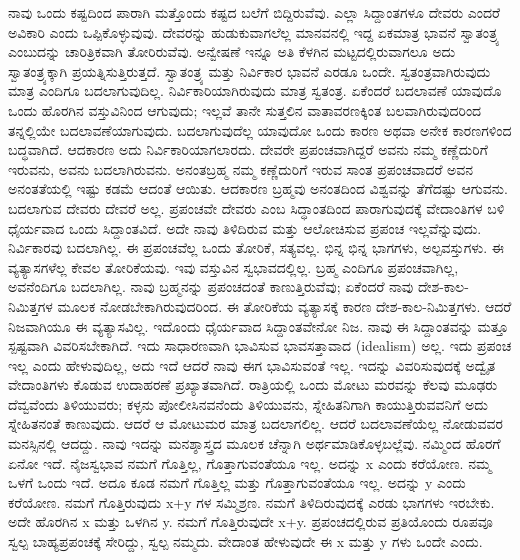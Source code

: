 ನಾವು ಒಂದು ಕಷ್ಟದಿಂದ ಪಾರಾಗಿ ಮತ್ತೊಂದು ಕಷ್ಟದ ಬಲೆಗೆ ಬಿದ್ದಿರುವೆವು. ಎಲ್ಲಾ ಸಿದ್ದಾಂತಗಳೂ ದೇವರು ಎಂದರೆ ಅವಿಕಾರಿ ಎಂದು ಒಪ್ಪಿಕೊಳ್ಳುವುವು. ದೇವರನ್ನು ಹುಡುಕುವಾಗಲೆಲ್ಲ ಮಾನವನಲ್ಲಿ ಇದ್ದ ಏಕಮಾತ್ರ ಭಾವನೆ ಸ್ವಾತಂತ್ರ್ಯ ಎಂಬುದನ್ನು ಚಾರಿತ್ರಿಕವಾಗಿ ತೋರಿರುವೆವು. ಅನ್ವೇಷಣೆ ಇನ್ನೂ ಅತಿ ಕೆಳಗಿನ ಮಟ್ಟದಲ್ಲಿರುವಾಗಲೂ ಅದು ಸ್ವಾತಂತ್ರ್ಯಕ್ಕಾಗಿ ಪ್ರಯತ್ನಿಸುತ್ತಿರುತ್ತದೆ. ಸ್ವಾತಂತ್ರ್ಯ ಮತ್ತು ನಿರ್ವಿಕಾರ ಭಾವನೆ ಎರಡೂ ಒಂದೇ. ಸ್ವತಂತ್ರವಾಗಿರುವುದು ಮಾತ್ರ ಎಂದಿಗೂ ಬದಲಾಗುವುದಿಲ್ಲ. ನಿರ್ವಿಕಾರಿಯಾಗಿರುವುದು ಮಾತ್ರ ಸ್ವತಂತ್ರ. ಏಕೆಂದರೆ ಬದಲಾವಣೆ ಯಾವುದೊ ಒಂದು ಹೊರಗಿನ ವಸ್ತುವಿನಿಂದ ಆಗುವುದು; ಇಲ್ಲವೆ ತಾನೇ ಸುತ್ತಲಿನ ವಾತಾವರಣಕ್ಕಿಂತ ಬಲವಾಗಿರುವುದರಿಂದ ತನ್ನಲ್ಲಿಯೇ ಬದಲಾವಣೆಯಾಗುವುದು. ಬದಲಾಗುವುದೆಲ್ಲ ಯಾವುದೋ ಒಂದು ಕಾರಣ ಅಥವಾ ಅನೇಕ ಕಾರಣಗಳಿಂದ ಬದ್ಧವಾಗಿದೆ. ಆದಕಾರಣ ಅದು ನಿರ್ವಿಕಾರಿಯಾಗಲಾರದು. ದೇವರೇ ಪ್ರಪಂಚವಾಗಿದ್ದರೆ ಅವನು ನಮ್ಮ ಕಣ್ಣೆದುರಿಗೆ ಇರುವನು, ಅವನು ಬದಲಾಗಿರುವನು. ಅನಂತಬ್ರಹ್ಮ ನಮ್ಮ ಕಣ್ಣೆದುರಿಗೆ ಇರುವ ಸಾಂತ ಪ್ರಪಂಚವಾದರೆ ಅವನ ಅನಂತತೆಯಲ್ಲಿ ಇಷ್ಟು ಕಡಮೆ ಆದಂತೆ ಆಯಿತು. ಆದಕಾರಣ ಬ್ರಹ್ಮವು ಅನಂತದಿಂದ ವಿಶ್ವವನ್ನು ತೆಗೆದಷ್ಟು ಆಗುವನು. ಬದಲಾಗುವ ದೇವರು ದೇವರೆ ಅಲ್ಲ. ಪ್ರಪಂಚವೇ ದೇವರು ಎಂಬ ಸಿದ್ಧಾಂತದಿಂದ ಪಾರಾಗುವುದಕ್ಕೆ ವೇದಾಂತಿಗಳ ಬಳಿ ಧೈರ್ಯವಾದ ಒಂದು ಸಿದ್ದಾಂತವಿದೆ. ಅದೇ ನಾವು ತಿಳಿದಿರುವ ಮತ್ತು ಆಲೋಚಿಸುವ ಪ್ರಪಂಚ ಇಲ್ಲವೆನ್ನುವುದು. ನಿರ್ವಿಕಾರವು ಬದಲಾಗಿಲ್ಲ. ಈ ಪ್ರಪಂಚವೆಲ್ಲ ಒಂದು ತೋರಿಕೆ, ಸತ್ಯವಲ್ಲ. ಭಿನ್ನ ಭಿನ್ನ ಭಾಗಗಳು, ಅಲ್ಪವಸ್ತುಗಳು. ಈ ವ್ಯತ್ಯಾಸಗಳೆಲ್ಲ ಕೇವಲ ತೋರಿಕೆಯವು. ಇವು ವಸ್ತುವಿನ ಸ್ವಭಾವದಲ್ಲಿಲ್ಲ. ಬ್ರಹ್ಮ ಎಂದಿಗೂ ಪ್ರಪಂಚವಾಗಿಲ್ಲ, ಅವನೆಂದಿಗೂ ಬದಲಾಗಿಲ್ಲ. ನಾವು ಬ್ರಹ್ಮನನ್ನು ಪ್ರಪಂಚದಂತೆ ಕಾಣುತ್ತಿರುವೆವು; ಏಕೆಂದರೆ ನಾವು ದೇಶ-ಕಾಲ-ನಿಮಿತ್ತಗಳ ಮೂಲಕ ನೋಡಬೇಕಾಗಿರುವುದರಿಂದ. ಈ ತೋರಿಕೆಯ ವ್ಯತ್ಯಾಸಕ್ಕೆ ಕಾರಣ ದೇಶ-ಕಾಲ-ನಿಮಿತ್ತಗಳು. ಆದರೆ ನಿಜವಾಗಿಯೂ ಈ ವ್ಯತ್ಯಾಸವಿಲ್ಲ. ಇದೊಂದು ಧೈರ್ಯವಾದ ಸಿದ್ದಾಂತವೇನೋ ನಿಜ. ನಾವು ಈ ಸಿದ್ದಾಂತವನ್ನು ಮತ್ತೂ ಸ್ಪಷ್ಟವಾಗಿ ವಿವರಿಸಬೇಕಾಗಿದೆ. ಇದು ಸಾಧಾರಣವಾಗಿ ಭಾವಿಸುವ ಭಾವಸತ್ತಾವಾದ (idealism) ಅಲ್ಲ. ಇದು ಪ್ರಪಂಚ ಇಲ್ಲ ಎಂದು ಹೇಳುವುದಿಲ್ಲ, ಅದು ಇದೆ ಆದರೆ ನಾವು ಈಗ ಭಾವಿಸುವಂತೆ ಇಲ್ಲ. ಇದನ್ನು ವಿವರಿಸುವುದಕ್ಕೆ ಅದ್ವೈತ ವೇದಾಂತಿಗಳು ಕೊಡುವ ಉದಾಹರಣೆ ಪ್ರಖ್ಯಾತವಾಗಿದೆ. ರಾತ್ರಿಯಲ್ಲಿ ಒಂದು ಮೋಟು ಮರವನ್ನು ಕೆಲವು ಮೂಢರು ದೆವ್ವವೆಂದು ತಿಳಿಯುವರು; ಕಳ್ಳನು ಪೋಲೀಸಿನವನೆಂದು ತಿಳಿಯುವನು, ಸ್ನೇಹಿತನಿಗಾಗಿ ಕಾಯುತ್ತಿರುವವನಿಗೆ ಅದು ಸ್ನೇಹಿತನಂತೆ ಕಾಣುವುದು. ಆದರೆ ಆ ಮೋಟುಮರ ಮಾತ್ರ ಬದಲಾಗಲಿಲ್ಲ. ಆದರೆ ಬದಲಾವಣೆಯೆಲ್ಲ ನೋಡುವವರ ಮನಸ್ಸಿನಲ್ಲಿ ಆದದ್ದು. ನಾವು ಇದನ್ನು ಮನಶ್ಶಾಸ್ತ್ರದ ಮೂಲಕ ಚೆನ್ನಾಗಿ ಅರ್ಥಮಾಡಿಕೊಳ್ಳಬಲ್ಲೆವು. ನಮ್ಮಿಂದ ಹೊರಗೆ ಏನೋ ಇದೆ. ನೈಜಸ್ವಭಾವ ನಮಗೆ ಗೊತ್ತಿಲ್ಲ, ಗೊತ್ತಾಗುವಂತೆಯೂ ಇಲ್ಲ. ಅದನ್ನು x ಎಂದು ಕರೆಯೋಣ. ನಮ್ಮ ಒಳಗೆ ಒಂದು ಇದೆ. ಅದೂ ಕೂಡ ನಮಗೆ ಗೊತ್ತಿಲ್ಲ ಮತ್ತು ಗೊತ್ತಾಗುವಂತೆಯೂ ಇಲ್ಲ. ಅದನ್ನು y ಎಂದು ಕರೆಯೋಣ. ನಮಗೆ ಗೊತ್ತಿರುವುದು x+y ಗಳ ಸಮ್ಮಿಶ್ರಣ. ನಮಗೆ ತಿಳಿದಿರುವುದಕ್ಕೆ ಎರಡು ಭಾಗಗಳು ಇರಬೇಕು. ಅದೇ ಹೊರಗಿನ x ಮತ್ತು ಒಳಗಿನ y. ನಮಗೆ ಗೊತ್ತಿರುವುದೇ x+y. ಪ್ರಪಂಚದಲ್ಲಿರುವ ಪ್ರತಿಯೊಂದು ರೂಪವೂ ಸ್ವಲ್ಪ ಬಾಹ್ಯಪ್ರಪಂಚಕ್ಕೆ ಸೇರಿದ್ದು, ಸ್ವಲ್ಪ ನಮ್ಮದು. ವೇದಾಂತ ಹೇಳುವುದೇ ಈ x ಮತ್ತು y ಗಳು ಒಂದೇ ಎಂದು.

